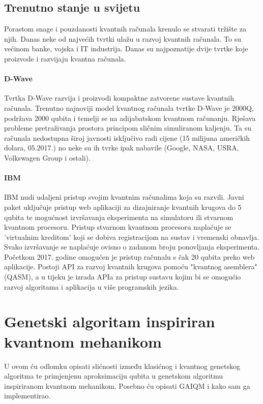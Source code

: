 \documentclass[times, utf8, zavrsni, numeric]{fer}
\begin{document}
\section{Trenutno stanje u svijetu}
Porastom snage i pouzdanosti kvantnih računala krenulo se stvarati tržište za njih. Danas neke od najvećih tvrtki ulažu u razvoj kvantnih računala. To su većinom banke, vojska i IT industrija.
Danas su najpoznatije dvije tvrtke koje proizvode i razvijaju kvantna računala.

\subsubsection{D-Wave}
Tvrtka D-Wave razvija i proizvodi kompaktne zatvorene sustave kvantnih računala. Trenutno najnoviji model kvantnog računala tvrtke D-Wave je 2000Q, podržava 2000 qubita i temelji se na adijabatskom kvantnom računanju. Rješava probleme pretraživanja prostora principom sličnim simuliranom kaljenju. Ta su računala nedostupna široj javnosti isključivo radi cijene (15 milijuna američkih dolara, 05.2017.) no neke su ih tvrke ipak nabavile (Google, NASA, USRA, Volkswagen Group i ostali).

\subsubsection{IBM}
IBM nudi udaljeni pristup svojim kvantnim računalima koja su razvili. Javni paket uključuje pristup web aplikaciji za dizajniranje kvantnih krugova do 5 qubita te mogućnost izvršavanja eksperimenta na simulatoru ili stvarnom kvantnom procesoru. Pristup stvarnom kvantnom procesoru naplaćuje se 'virtualnim kreditom' koji se dobiva registracijom na sustav i vremenski obnavlja. Svako izvršavanje se naplaćuje ovisno o zadanom broju ponovljanja eksperimenta. Početkom 2017. godine omogućen je pristup računalu s čak 20 qubita preko web aplikacije. Postoji API za razvoj kvantnih krugova pomoću "kvantnog asemblera" (QASM), a u tijeku je izrada APIa za pristup sustavu kojim bi se omogućio razvoj algoritama i aplikacija u više programskih jezika.

\chapter{Genetski algoritam inspiriran kvantnom mehanikom} 
\label{ch:gaiqm}
U ovom ću odlomku opisati slićnosti između klasićnog i kvantnog genetskog algoritma te primjenjenu aproksimaciju qubita u genetskom algoritmu inspiriranom kvantnom mehanikom. Posebno ću opisati GAIQM i kako sam ga implementirao.
\end{document}
